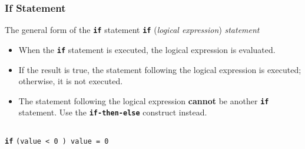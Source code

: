 \documentclass[slidestop,mathserif,compress,xcolor=svgnames]{beamer}
\newenvironment{bblock}[0]
{
\begin{beamerboxesrounded}[upper=uppercol1,lower=lowercol1,shadow=true]}
{\end{beamerboxesrounded}}
\begin{document}
\begin{frame}
  \frametitle{\small If Statement}
  \begin{block}{\scriptsize The general form of the \textbf{\texttt{if}} statement}
  \textbf{\texttt{if}} (\textit{logical expression}) \textit{statement}
  \end{block}
  \begin{itemize}
    \item When the \textbf{\texttt{if}} statement is executed, the logical expression is evaluated. 
    \item If the result is true, the statement following the logical expression is executed; otherwise, it is not executed.
    \item The statement following the logical expression \textbf{cannot} be another \textbf{\texttt{if}} statement. Use the \textbf{\texttt{if-then-else}} construct instead.
  \end{itemize}
  \begin{columns}
    \column{5cm}
    \begin{bblock}{}
      \textbf{\texttt{if}} \texttt{(value < 0 ) value = 0}
    \end{bblock}
  \end{columns}
\end{frame}
\end{document}
